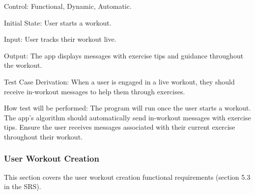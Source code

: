 \documentclass[12pt, titlepage]{article}
\begin{document}
\begin{enumerate}
        Control: Functional, Dynamic, Automatic.

        Initial State: User starts a workout.

        Input: User tracks their workout live.

        Output: The app displays messages with exercise tips and guidance throughout the workout.

        Test Case Derivation: When a user is engaged in a live workout, they should receive in-workout messages to help them through exercises.

        How test will be performed: The program will run once the user starts a workout. The app’s algorithm should automatically send in-workout messages with exercise tips. Ensure the user receives messages associated with their current exercise throughout their workout.

    \end{enumerate}

    \subsubsection{User Workout Creation}
    This section covers the user workout creation functional requirements (section 5.3 in the SRS).
\end{document}
